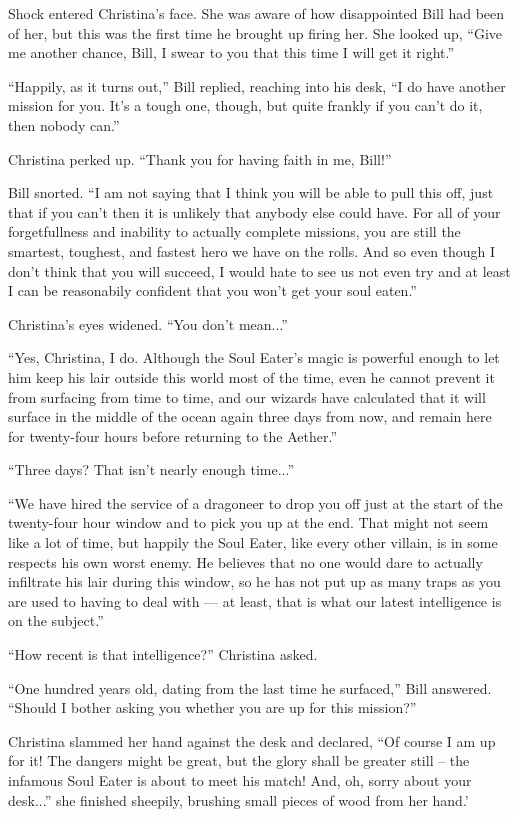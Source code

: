 \documentclass[showtrims,b6paper,draft,10pt]{memoir}
\begin{document}
Shock entered Christina's face.  She was aware of how disappointed Bill had been of her, but this was the first time he brought up firing her.  She looked up,  ``Give me another chance, Bill, I swear to you that this time I will get it right.''

``Happily, as it turns out,'' Bill replied, reaching into his desk, ``I do have another mission for you.  It's a tough one, though, but quite frankly if you can't do it, then nobody can.''

Christina perked up.  ``Thank you for having faith in me, Bill!''

Bill snorted.  ``I am not saying that I think you will be able to pull this off, just that if you can't then it is unlikely that anybody else could have.  For all of your forgetfullness and inability to actually complete missions, you are still the smartest, toughest, and fastest hero we have on the rolls.  And so even though I don't think that you will succeed, I would hate to see us not even try and at least I can be reasonabily confident that you won't get your soul eaten.''

Christina's eyes widened.  ``You don't mean...''

``Yes, Christina, I do.  Although the Soul Eater's magic is powerful enough to let him keep his lair outside this world most of the time, even he cannot prevent it from surfacing from time to time, and our wizards have calculated that it will surface in the middle of the ocean again three days from now, and remain here for twenty-four hours before returning to the Aether.''

``Three days?  That isn't nearly enough time...''

``We have hired the service of a dragoneer to drop you off just at the start of the twenty-four hour window and to pick you up at the end.  That might not seem like a lot of time, but happily the Soul Eater, like every other villain, is in some respects his own worst enemy.  He believes that no one would dare to actually infiltrate his lair during this window, so he has not put up as many traps as you are used to having to deal with --- at least, that is what our latest intelligence is on the subject.''

``How recent is that intelligence?''  Christina asked.

``One hundred years old, dating from the last time he surfaced,''  Bill answered.  ``Should I bother asking you whether you are up for this mission?''

Christina slammed her hand against the desk and declared, ``Of course I am up for it!  The dangers might be great, but the glory shall be greater still -- the infamous Soul Eater is about to meet his match!  And, oh, sorry about your desk...''  she finished sheepily, brushing small pieces of wood from her hand.'
\end{document}
